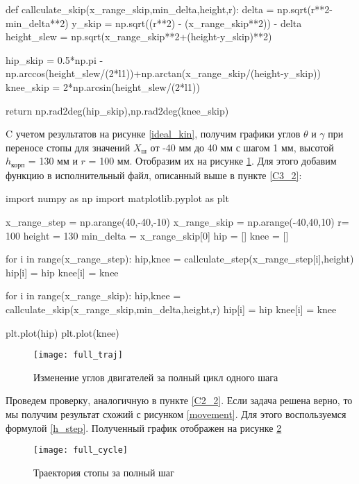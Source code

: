  \begin{python}
	def callculate_skip(x_range_skip,min_delta,height,r):
		delta = np.sqrt(r**2-min_delta**2)
		y_skip = np.sqrt((r**2) - (x_range_skip**2)) - delta
		height_slew = np.sqrt(x_range_skip**2+(height-y_skip)**2)
		
		hip_skip = 0.5*np.pi - np.arccos(height_slew/(2*l1))+np.arctan(x_range_skip/(height-y_skip))
		knee_skip = 2*np.arcsin(height_slew/(2*l1))
		
		return np.rad2deg(hip_skip),np.rad2deg(knee_skip)
\end{python}

C учетом результатов на рисунке \ref{ideal_kin}, получим графики углов $\theta$ и $\gamma$ при переносе стопы для значений $X_{\text{ш}}$ от -40 мм до 40 мм с шагом 1 мм, высотой $h_\text{корп}$ = 130 мм и $r$ = 100 мм. Отобразим их на рисунке \ref{full_traj}. Для этого добавим функцию в исполнительный файл, описанный выше в пункте \ref{C3_2}:
\newpage
\begin{python}
	import numpy as np
	import matplotlib.pyplot as plt
	
	x_range_step = np.arange(40,-40,-10)
	x_range_skip = np.arange(-40,40,10)
	r= 100
	height = 130
	min_delta = x_range_skip[0]
	hip = []
	knee = []
	
	for i in range(x_range_step):
		hip,knee = callculate_step(x_range_step[i],height)
		hip[i] = hip
		knee[i] = knee
	
	for i in range(x_range_skip):
		hip,knee = callculate_skip(x_range_skip,min_delta,height,r)
		hip[i] = hip
		knee[i] = knee
	
	plt.plot(hip)
	plt.plot(knee)
\end{python}

\begin{figure}[h!]
	\begin{center}
		\texttt{[image: full\_traj]}
		\caption{Изменение углов двигателей за полный цикл одного шага}
		\label{full_traj}
	\end{center}
\end{figure}
\newpage
Проведем проверку, аналогичную в пункте \ref{C2_2}. Если задача решена верно, то мы получим результат схожий с рисунком \ref{movement}. Для этого воспользуемся формулой \ref{h_step}. Полученный график отображен на рисунке \ref{full_cycle}

\begin{figure}[h!]
	\begin{center}
		\texttt{[image: full\_cycle]}
		\caption{Траектория стопы за полный шаг}
		\label{full_cycle}
	\end{center}
\end{figure}

\newpage